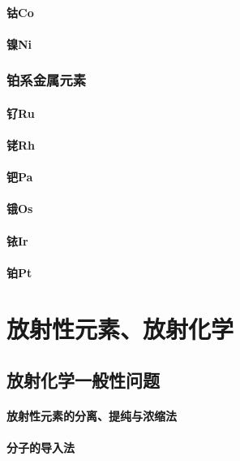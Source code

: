 \documentclass[UTF8]{../03-Chemistry}
\begin{document}
        \subsubsection{钴Co}
        \subsubsection{镍Ni}
    \subsection{铂系金属元素}
        \subsubsection{钌Ru}
        \subsubsection{铑Rh}
        \subsubsection{钯Pa}
        \subsubsection{锇Os}
        \subsubsection{铱Ir}
        \subsubsection{铂Pt}





\chapter{放射性元素、放射化学}
\section{放射化学一般性问题}
    \subsubsection{放射性元素的分离、提纯与浓缩法}
    \subsubsection{分子的导入法}
\end{document}
